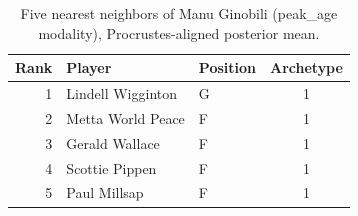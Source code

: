 \begin{table}[htbp]
  \centering\small
  \begin{tabular}{rllc}
    \toprule
    Rank & Player & Position & Archetype \\
    \midrule
    1 & Lindell Wigginton & G & 1 \\
    2 & Metta World Peace & F & 1 \\
    3 & Gerald Wallace & F & 1 \\
    4 & Scottie Pippen & F & 1 \\
    5 & Paul Millsap & F & 1 \\
    \bottomrule
  \end{tabular}
  \caption{Five nearest neighbors of Manu Ginobili (peak_age modality), Procrustes-aligned posterior mean.}
  \label{tab:Manu_Ginobili_neighbors_peak_age}
\end{table}


